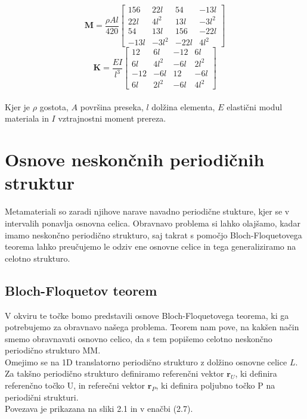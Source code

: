 \documentclass[12pt]{report}
\begin{document}
\begin{equation}
  \mathbf{M} = \frac{\rho A l}{420} 
  \begin{bmatrix}
    156 & 22l & 54 & -13l \\
    22l & 4l^2 & 13l & -3l^2 \\
    54 & 13l & 156 & -22l \\
    -13l & -3l^2 & -22l & 4l^2
  \end{bmatrix}
\end{equation}
\begin{equation}
  \mathbf{K} = \frac{EI}{l^3} 
  \begin{bmatrix}
    12 & 6l & -12 & 6l \\
    6l & 4l^2 & -6l & 2l^2 \\
    -12 & -6l & 12 & -6l \\
    6l & 2l^2 & -6l & 4l^2
  \end{bmatrix}
\end{equation}
\\
Kjer je $\rho$ gostota, $A$ površina preseka, $l$ dolžina elementa, $E$ elastični modul materiala in $I$ vztrajnostni moment prereza.

\section{Osnove neskončnih periodičnih struktur}
Metamateriali so zaradi njihove narave navadno periodične stukture, kjer se v intervalih ponavlja osnovna celica.
Obravnavo problema si lahko olajšamo, kadar imamo neskončno periodično strukturo, saj takrat s pomočjo Bloch-Floquetovega teorema lahko 
preučujemo le odziv ene osnovne celice in tega generaliziramo na celotno strukturo.

\subsection{Bloch-Floquetov teorem}
V okviru te točke bomo predstavili osnove Bloch-Floquetovega teorema, ki ga potrebujemo za obravnavo našega problema.
Teorem nam pove, na kakšen način smemo obravnavati osnovno celico, da s tem popišemo celotno neskončno periodično strukturo \ac{MM}. \\
Omejimo se na 1D translatorno periodično strukturo z dolžino osnovne celice $L$. Za takšno periodično strukturo definiramo referenčni vektor $\mathbf{r}_U$, 
ki definira referenčno točko U, in referečni vektor $\mathbf{r}_P$, ki definira poljubno točko P na periodični strukturi. \cite{vanbelle, kosir}
\\Povezava je prikazana na sliki 2.1 in v enačbi (2.7).
\end{document}
